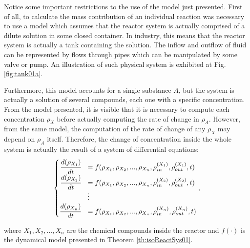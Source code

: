 \documentclass[a4paper,11pt]{book}
\numberwithin{figure}{chapter}
\numberwithin{equation}{chapter}
\numberwithin{table}{chapter}
\theoremstyle{definition}
\begin{document}
Notice some important restrictions to the use of the model just presented. First of all, to calculate the mass contribution of an individual reaction was necessary to use a model which assumes that the reactor system is actually comprised of a dilute solution in some closed container. In industry, this means that the reactor system is actually a tank containing the solution. The inflow and outflow of fluid can be represented by flows through pipes which can be manipulated by some valve or pump. An illustration of such physical system is exhibited at Fig. \ref{fig:tank01a}.

Furthermore, this model accounts for a single substance $A$, but the system is actually a solution of several compounds, each one with a specific concentration. From the model presented, it is visible that it is necessary to compute each concentration $\rho_X$ before actually computing the rate of change in $\rho_A$. However, from the same model, the computation of the rate of change of any $\rho_X$ may depend on $\rho_A$ itself. Therefore, the change of concentration inside the whole system is actually the result of a system of differential equations:
\begin{align}   \label{eq:isoSys01}
\begin{cases}
    \hfill \cfrac{d (\rho_{X_1})}{dt} &= f(\rho_{X_1}, \rho_{X_2}, ..., \rho_{X_n}, \rho_{in}^{(X_1)}, \rho_{out}^{(X_1)}, t) \\
    \hfill \cfrac{d (\rho_{X_2})}{dt} &= f(\rho_{X_1}, \rho_{X_2}, ..., \rho_{X_n}, \rho_{in}^{(X_2)}, \rho_{out}^{(X_2)}, t) \\
    & \vdots   \\
    \hfill \cfrac{d (\rho_{X_n})}{dt} &= f(\rho_{X_1}, \rho_{X_2}, ..., \rho_{X_n}, \rho_{in}^{(X_n)}, \rho_{out}^{(X_n)}, t)
\end{cases}
,\end{align}

\noindent where $X_1, X_2, ..., X_n$ are the chemical compounds inside the reactor and $f(\cdot)$ is the dynamical model presented in Theorem \ref{th:isoReactSys01}.
\end{document}
